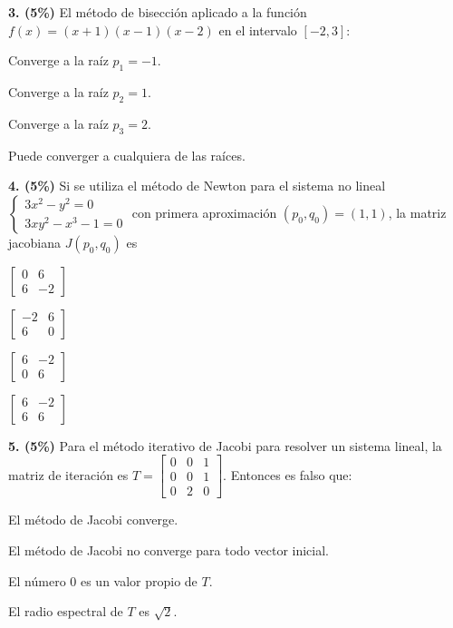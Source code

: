 \documentclass[11pt]{article}
\begin{document}
\newpage
\noindent\textbf{3. (5\%)} El método de bisección aplicado a la función $f(x)=(x+1)(x-1)(x-2)$ en el intervalo $[-2,3]$:
\begin{opciones}
\item Converge a la raíz $p_1=-1$.
\item Converge a la raíz $p_2=1$.
\item Converge a la raíz $p_3=2$.
\item Puede converger a cualquiera de las raíces.
\end{opciones}

\vspace{0.3cm}
\noindent\textbf{4. (5\%)} Si se utiliza el método de Newton para el sistema no lineal $\begin{cases}3x^2-y^2=0\\3xy^2-x^3-1=0\end{cases}$ con primera aproximación $(p_0,q_0)=(1,1)$, la matriz jacobiana $J(p_0,q_0)$ es
\begin{opciones}
\item $\begin{bmatrix}0&6\\6&-2\end{bmatrix}$
\item $\begin{bmatrix}-2&6\\6&0\end{bmatrix}$
\item $\begin{bmatrix}6&-2\\0&6\end{bmatrix}$
\item $\begin{bmatrix}6&-2\\6&6\end{bmatrix}$
\end{opciones}

\vspace{0.3cm}
\noindent\textbf{5. (5\%)} Para el método iterativo de Jacobi para resolver un sistema lineal, la matriz de iteración es $T=\begin{bmatrix}0&0&1\\0&0&1\\0&2&0\end{bmatrix}$. Entonces es falso que:
\begin{opciones}
\item El método de Jacobi converge.
\item El método de Jacobi no converge para todo vector inicial.
\item El número 0 es un valor propio de $T$.
\item El radio espectral de $T$ es $\sqrt2$.
\end{opciones}
\end{document}
